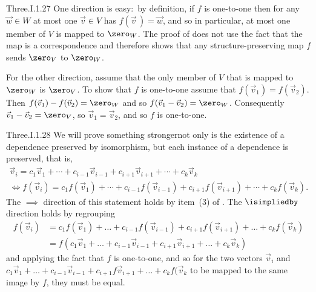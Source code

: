 \begin{ans}{Three.I.1.27}
      One direction is easy:~by definition, if \( f \) is one-to-one
      then for any
      \( \vec{w}\in W \) at most one \( \vec{v}\in V \) has
      \( f(\vec{v}\,)=\vec{w} \), and so in particular, at most one member of
      \( V \) is mapped to \( \zero_W \).
      The proof of  does not use the
      fact that the map is a correspondence and therefore
      shows that any structure-preserving map
      \( f \) sends \( \zero_V \) to \( \zero_W \).

      For the other direction, assume that the only member of \( V \)
      that is mapped to \( \zero_W \) is \( \zero_V \).
      To show that
      \( f \) is one-to-one assume that \( f(\vec{v}_1)=f(\vec{v}_2) \).
      Then \( f(\vec{v}_1)-f(\vec{v}_2)=\zero_W \) and so
      \( f(\vec{v}_1-\vec{v}_2)=\zero_W \).
      Consequently \( \vec{v}_1-\vec{v}_2=\zero_V \), so
      $\vec{v}_1=\vec{v}_2$, and so \( f \) is one-to-one.
    
\end{ans}
\begin{ans}{Three.I.1.28}
      We will prove something stronger\Dash not only is the existence of a
      dependence preserved by isomorphism, but each instance of a dependence is
      preserved, that is,
      \begin{multline*}
        \vec{v}_i=c_1\vec{v}_1+\cdots+c_{i-1}\vec{v}_{i-1}
                   +c_{i+1}\vec{v}_{i+1}+\cdots+c_k\vec{v}_k   \\
        \iff
        f(\vec{v}_i)=c_1f(\vec{v}_1)+\cdots+c_{i-1}f(\vec{v}_{i-1})
                     +c_{i+1}f(\vec{v}_{i+1})+\cdots+c_kf(\vec{v}_k).
      \end{multline*}
      The \( \implies \) direction of this statement holds by item~(3) of
      .
      The \( \isimpliedby \) direction holds by regrouping
      \begin{align*}
         f(\vec{v}_i)
           &=c_1f(\vec{v}_1)+\dots+c_{i-1}f(\vec{v}_{i-1})
                     +c_{i+1}f(\vec{v}_{i+1})+\dots+c_kf(\vec{v}_k)  \\
           &=f(c_1\vec{v}_1+\dots+c_{i-1}\vec{v}_{i-1}
                     +c_{i+1}\vec{v}_{i+1}+\dots+c_k \vec{v}_k)
      \end{align*}
      and applying the fact that $f$ is one-to-one, and so for the two
      vectors $\vec{v}_i$ and
      $c_1\vec{v}_1+\dots+c_{i-1}\vec{v}_{i-1}
              +c_{i+1}f\vec{v}_{i+1}+\dots+c_kf(\vec{v}_k$
      to be mapped to the same image by $f$, they must be equal.
    
\end{ans}
